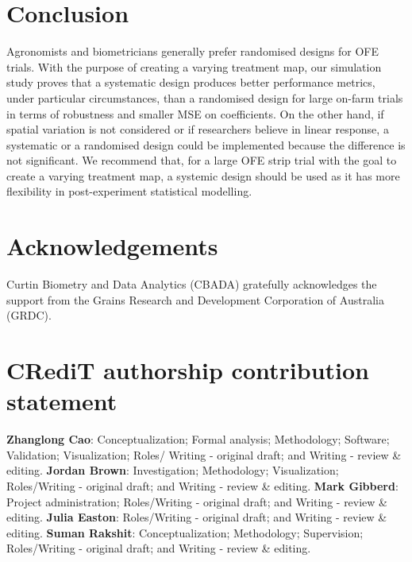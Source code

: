\documentclass[a4paper]{article} 	%
\begin{document}
\section{Conclusion}\label{Sec:Conclusion}

Agronomists and biometricians generally prefer randomised designs for OFE trials. With the purpose of creating a varying treatment map, our simulation study proves that a systematic design produces better performance metrics, under particular circumstances, than a randomised design for large on-farm trials in terms of robustness and smaller MSE on coefficients. On the other hand, if spatial variation is not considered or if researchers believe in linear response, a systematic or a randomised design could be implemented because the difference is not significant. We recommend that, for a large OFE strip trial with the goal to create a varying treatment map, a systemic design should be used as it has more flexibility in post-experiment statistical modelling. 


\section*{Acknowledgements}

Curtin Biometry and Data Analytics (CBADA) gratefully acknowledges the support from the Grains Research and Development Corporation of Australia (GRDC).

\section*{CRediT authorship contribution statement}

\textbf{Zhanglong Cao}: Conceptualization; Formal analysis; Methodology; Software; Validation; Visualization; Roles/ Writing - original draft; and Writing - review \& editing. \textbf{Jordan Brown}: Investigation; Methodology; Visualization; Roles/Writing - original draft; and Writing - review \& editing. \textbf{Mark Gibberd}: Project administration; Roles/Writing - original draft; and Writing - review \& editing. \textbf{Julia Easton}: Roles/Writing - original draft; and Writing - review \& editing. \textbf{Suman Rakshit}: Conceptualization; Methodology; Supervision; Roles/Writing - original draft; and Writing - review \& editing. 
\end{document}
